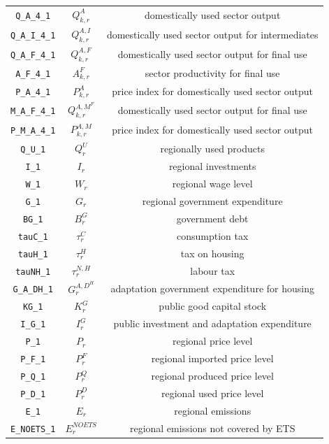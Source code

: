 \begin{center}
\begin{longtable}{ccc}
\texttt{Q\_A\_4\_1} & ${Q^{A}_{k,r}}$ & domestically used sector output\\
\texttt{Q\_A\_I\_4\_1} & ${Q^{A,I}_{k,r}}$ & domestically used sector output for intermediates\\
\texttt{Q\_A\_F\_4\_1} & ${Q^{A,F}_{k,r}}$ & domestically used sector output for final use\\
\texttt{A\_F\_4\_1} & ${A^{F}_{k,r}}$ & sector productivity for final use\\
\texttt{P\_A\_4\_1} & ${P^{A}_{k,r}}$ & price index for domestically used sector output\\
\texttt{M\_A\_F\_4\_1} & ${Q^{A,M^F}_{k,r}}$ & domestically used sector output for final use\\
\texttt{P\_M\_A\_4\_1} & ${P^{A,M}_{k,r}}$ & price index for domestically used sector output\\
\texttt{Q\_U\_1} & ${Q^{U}_{r}}$ & regionally used products\\
\texttt{I\_1} & ${I_{r}}$ & regional investments\\
\texttt{W\_1} & ${W_{r}}$ & regional wage level\\
\texttt{G\_1} & ${G_{r}}$ & regional government expenditure\\
\texttt{BG\_1} & ${B^G_{r}}$ & government debt\\
\texttt{tauC\_1} & ${\tau^{C}_{r}}$ & consumption tax\\
\texttt{tauH\_1} & ${\tau^{H}_{r}}$ & tax on housing\\
\texttt{tauNH\_1} & ${\tau^{N,H}_{r}}$ & labour tax\\
\texttt{G\_A\_DH\_1} & ${G^{A,D^H}_{r}}$ & adaptation government expenditure for housing\\
\texttt{KG\_1} & ${K^G_{r}}$ & public good capital stock\\
\texttt{I\_G\_1} & ${I^G_{r}}$ & public investment and adaptation expenditure\\
\texttt{P\_1} & ${P_{r}}$ & regional price level\\
\texttt{P\_F\_1} & ${P^F_{r}}$ & regional imported price level\\
\texttt{P\_Q\_1} & ${P^Q_{r}}$ & regional produced price level\\
\texttt{P\_D\_1} & ${P^D_{r}}$ & regional used price level\\
\texttt{E\_1} & ${E_r}$ & regional emissions\\
\texttt{E\_NOETS\_1} & ${E^{NOETS}_r}$ & regional emissions not covered by ETS\\

\end{longtable}
\end{center}

